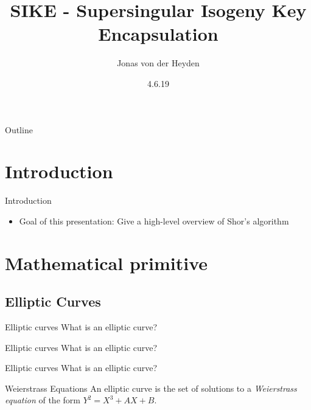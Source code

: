 \documentclass{beamer}
\title[Shor's Algorithm]{SIKE - Supersingular Isogeny Key Encapsulation}
\author{Jonas von der Heyden}
\institute{FU Berlin}
\date{4.6.19}
\begin{document}
\newcommand{\source}[1]{\caption*{Source: {#1}} } %
\begin{frame}
  \titlepage
\end{frame}

\begin{frame}{Outline}
  \tableofcontents
\end{frame}

\section{Introduction}

\begin{frame}{Introduction}

	\begin{itemize}
  		\item Goal of this presentation: Give a high-level overview of Shor's algorithm
	\end{itemize}

\end{frame}

\section{Mathematical primitive}

\subsection{Elliptic Curves}

\begin{frame}{Elliptic curves}
	What is an elliptic curve?
\end{frame}

\begin{frame}{Elliptic curves}
What is an elliptic curve?

\end{frame}
\begin{frame}{Elliptic curves}
What is an elliptic curve?
\begin{block}{Weierstrass Equations}
	An elliptic curve is the set of solutions to a \textit{Weierstrass equation} of the form $Y^2=X^3+AX+B$.
\end{block}
\end{frame}
\end{document}
